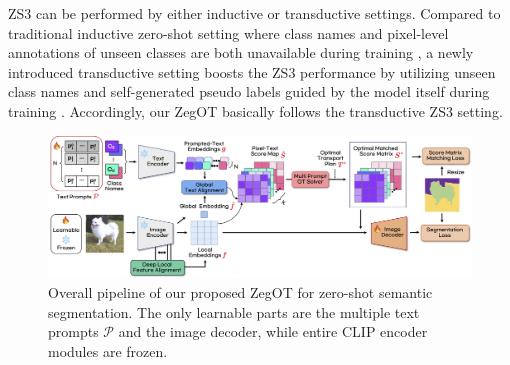 \documentclass[nohyperref]{article}
\theoremstyle{plain}
\theoremstyle{definition}
\theoremstyle{remark}
\begin{document}
ZS3 can be performed by either inductive or transductive settings. Compared to traditional inductive zero-shot setting where class names and pixel-level annotations of unseen classes are both unavailable during training \cite{ding2022zegformer}, a newly introduced transductive setting boosts the ZS3 performance by utilizing unseen class names and self-generated pseudo labels guided by the model itself during training \cite{gu2020cagnet, xu2021zsseg, pastore2021strict, zhou2022zegclip, zhou2022maskclip}. Accordingly, our ZegOT basically follows the transductive ZS3 setting.



\begin{figure}[ht]
\vskip 0.1in
\begin{center}
\includegraphics[width=0.97\linewidth]{fig/main.jpg}
\caption{Overall pipeline of our proposed ZegOT for zero-shot semantic segmentation. The only learnable parts are the multiple text prompts $\mathcal{P}$ and the image decoder, while entire CLIP encoder modules are frozen.}
\label{fig_main0}
\end{center}
\vskip -0.1in
\end{figure}

\end{document}
